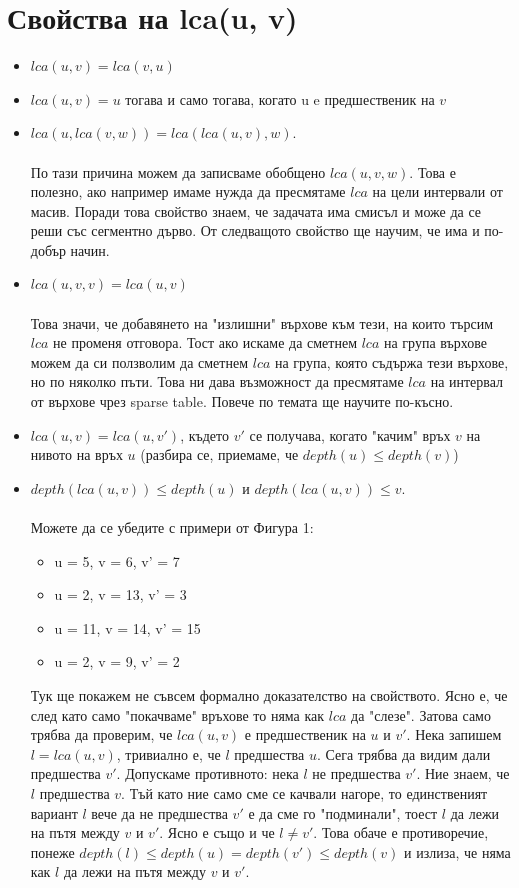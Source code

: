 \documentclass[12pt]{article}
\begin{document}
\section*{Свойства на lca(u, v)}
\begin{itemize}
	\item $lca(u, v) = lca(v, u)$
	\item $lca(u, v) = u$ тогава и само тогава, когато u e предшественик на $v$
	\item $lca(u, lca(v, w)) = lca(lca(u, v), w)$.
\paragraph*{}
По тази причина можем да записваме обобщено $lca(u, v, w)$. Това е полезно, ако например имаме нужда да пресмятаме $lca$ на цели интервали от масив. Поради това свойство знаем, че задачата има смисъл и може да се реши със сегментно дърво. От следващото свойство ще научим, че има и по-добър начин.
	\item $lca(u, v, v) = lca(u, v)$
\paragraph*{}
Това значи, че добавянето на "излишни" върхове към тези, на които търсим $lca$ не променя отговора. Тост ако искаме да сметнем $lca$ на група върхове можем да си ползволим да сметнем $lca$ на група, която съдържа тези върхове, но по няколко пъти. Това ни дава възможност да пресмятаме $lca$ на интервал от върхове чрез sparse table. Повече по темата ще научите по-късно.
	\item $lca(u, v) = lca(u, v')$, където $v'$ се получава, когато "качим" връх $v$ на нивото на връх $u$ (разбира се, приемаме, че $depth(u) \leq depth(v)$)
	\item $depth(lca(u, v)) \leq depth(u)$ и $depth(lca(u, v)) \leq v$.
\paragraph*{}
Можете да се убедите с примери от Фигура 1:
\begin{itemize}
	\item u = 5, v = 6, v' = 7
	\item u = 2, v = 13, v' = 3
	\item u = 11, v = 14, v' = 15
	\item u = 2, v = 9, v' = 2
\end{itemize} 
Тук ще покажем не съвсем формално доказателство на свойството. Ясно е, че след като само "покачваме" връхове то няма как $lca$ да "слезе". Затова само трябва да проверим, че $lca(u, v)$ е предшественик на $u$ и $v'$. Нека запишем $l = lca(u, v)$, тривиално е, че $l$ предшества $u$. Сега трябва да видим дали предшества $v'$. Допускаме противното: нека $l$ не предшества $v'$. Ние знаем, че $l$ предшества $v$. Тъй като ние само сме се качвали нагоре, то единственият вариант $l$ вече да не предшества $v'$ е да сме го "подминали", тоест $l$ да лежи на пътя между $v$ и $v'$. Ясно е също и че $l \neq v'$. Това обаче е противоречие, понеже $depth(l) \leq depth(u) = depth(v') \leq depth(v)$ и излиза, че няма как $l$ да лежи на пътя между $v$ и $v'$.
\end{itemize}
\end{document}
